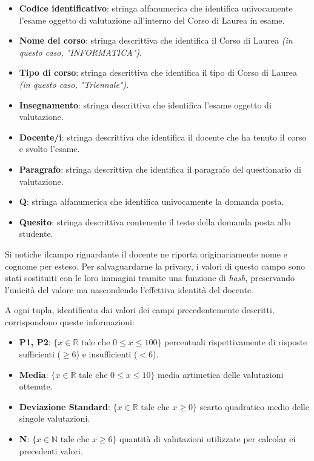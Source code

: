 \begin{itemize}
	\item \textbf{Codice identificativo}: stringa alfanumerica che identifica univocamente l'esame oggetto di valutazione all'interno del Corso di Laurea in esame.
	\item \textbf{Nome del corso}: stringa descrittiva che identifica il Corso di Laurea \textit{(in questo caso, "INFORMATICA")}.
	\item \textbf{Tipo di corso}: stringa descrittiva che identifica il tipo di Corso di Laurea \textit{(in questo caso, "Triennale")}.
	\item \textbf{Insegnamento}: stringa descrittiva che identifica l'esame oggetto di valutazione.
	\item \textbf{Docente/i}: stringa descrittiva che identifica il docente che ha tenuto il corso e svolto l'esame.
	\item \textbf{Paragrafo}: stringa descrittiva che identifica il paragrafo del questionario di valutazione.
	\item \textbf{Q}: stringa alfanumerica che identifica univocamente la domanda posta.
	\item \textbf{Quesito}: stringa descrittiva contenente il testo della domanda posta allo studente.
\end{itemize}

\noindent  Si notiche ilcampo riguardante il docente ne riporta originariamente nome e cognome per esteso. Per salvaguardarne la privacy, i valori di questo campo sono stati sostituiti con le loro immagini tramite una funzione di \textit{hash}, preservando l'unicità del valore ma nascondendo l'effettiva identità del docente.

A ogni tupla, identificata dai valori dei campi precedentemente descritti, corrispondono queste informazioni:

\begin{itemize}
	\item \textbf{P1, P2}: $ \{ x \in \mathbb{R} \text{ tale che } 0 \leq x \leq 100 \} $  percentuali rispettivamente di risposte sufficienti ($ \geq 6$) e insufficienti ($ < 6$).
	\item \textbf{Media}:  $ \{ x \in \mathbb{R} \text{ tale che } 0 \leq x \leq 10 \} $ media artimetica delle valutazioni ottenute.
	\item \textbf{Deviazione Standard}:  $ \{ x \in \mathbb{R} \text{ tale che } x \geq 0\} $ scarto quadratico medio delle singole valutazioni.
	\item \textbf{N}:  $ \{ x \in \mathbb{N} \text{ tale che } x \geq 6\} $ quantità di valutazioni utilizzate per calcolar ei precedenti valori.
\end{itemize}

